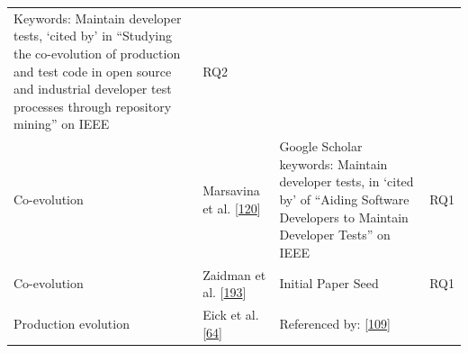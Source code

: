 \documentclass[]{book}
\begin{document}
\begin{longtable}[]{@{}llll@{}}
\begin{minipage}[t]{0.50\columnwidth}
Keywords: Maintain developer tests, `cited by' in ``Studying the
co-evolution of production and test code in open source and industrial
developer test processes through repository mining'' on IEEE\strut
\end{minipage} & \begin{minipage}[t]{0.04\columnwidth}\raggedright\strut
RQ2\strut
\end{minipage}\tabularnewline
\begin{minipage}[t]{0.18\columnwidth}\raggedright\strut
Co-evolution\strut
\end{minipage} & \begin{minipage}[t]{0.16\columnwidth}\raggedright\strut
Marsavina et al. {[}\protect\hyperlink{ref-marsavina2014}{120}{]}\strut
\end{minipage} & \begin{minipage}[t]{0.50\columnwidth}\raggedright\strut
Google Scholar keywords: Maintain developer tests, in `cited by' of
``Aiding Software Developers to Maintain Developer Tests'' on IEEE\strut
\end{minipage} & \begin{minipage}[t]{0.04\columnwidth}\raggedright\strut
RQ1\strut
\end{minipage}\tabularnewline
\begin{minipage}[t]{0.18\columnwidth}\raggedright\strut
Co-evolution\strut
\end{minipage} & \begin{minipage}[t]{0.16\columnwidth}\raggedright\strut
Zaidman et al.
{[}\protect\hyperlink{ref-zaidman2011studying}{193}{]}\strut
\end{minipage} & \begin{minipage}[t]{0.50\columnwidth}\raggedright\strut
Initial Paper Seed\strut
\end{minipage} & \begin{minipage}[t]{0.04\columnwidth}\raggedright\strut
RQ1\strut
\end{minipage}\tabularnewline
\begin{minipage}[t]{0.18\columnwidth}\raggedright\strut
Production evolution\strut
\end{minipage} & \begin{minipage}[t]{0.16\columnwidth}\raggedright\strut
Eick et al. {[}\protect\hyperlink{ref-eick2001}{64}{]}\strut
\end{minipage} & \begin{minipage}[t]{0.50\columnwidth}\raggedright\strut
Referenced by: {[}\protect\hyperlink{ref-leung2015testing}{109}{]}\strut

\end{minipage}
\end{longtable}
\end{document}
